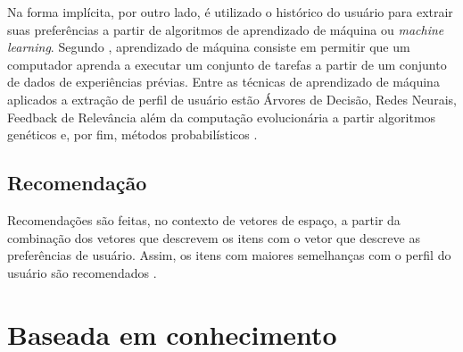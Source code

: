     Na forma implícita, por outro lado, é utilizado o histórico do usuário para extrair suas preferências a partir de algoritmos de aprendizado de máquina ou \textit{machine learning}. Segundo , aprendizado de máquina consiste em permitir que um computador aprenda a executar um conjunto de tarefas a partir de um conjunto de dados de experiências prévias.
    Entre as técnicas de aprendizado de máquina aplicados a extração de perfil de usuário estão Árvores de Decisão, Redes Neurais, Feedback de Relevância além da computação evolucionária a partir algoritmos genéticos e, por fim,  métodos probabilísticos \cite{Ricci2010}.
   
    \subsection{Recomendação}
    
    Recomendações são feitas, no contexto de vetores de espaço, a partir da combinação dos vetores que descrevem os itens com o vetor que descreve as preferências de usuário. Assim, os itens com maiores semelhanças com o perfil do usuário são recomendados \cite{Aggarwal2016}.

            
                
            
        
\section{Baseada em conhecimento} 
    

